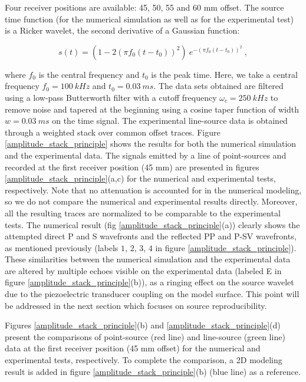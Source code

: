 \documentclass[manuscript,revised]{geophysics}
\begin{document}
Four receiver positions are available: 45, 50, 55 and 60 mm offset. The source time function (for the numerical simulation as well as for the experimental test) is a Ricker wavelet, the second derivative of a Gaussian function:

\begin{equation}
s(t) = (1-2(\pi f_{0}(t-t_{0}))^{2})~e^{-(\pi f_{0}(t-t_{0}))^{2}}~,
\label{eq:ricker-source} 
\end{equation}

\noindent where $f_{0}$ is the central frequency and $t_{0}$ is the peak time. Here, we take a central frequency $f_{0}=100\ kHz$ and $t_{0}=0.03\ ms$. The data sets obtained are filtered using a low-pass Butterworth filter with a cutoff frequency $\omega_{c}=250\ kHz$ to remove noise and tapered at the beginning using a cosine taper function of width $w=0.03\ ms$ on the time signal. The experimental line-source data is obtained through a weighted stack over common offset traces. Figure \ref{amplitude_stack_principle} shows the results for both the numerical simulation and the experimental data. The signals emitted by a line of point-sources and recorded at the first receiver position (45 mm) are presented in figures \ref{amplitude_stack_principle}(a,c) for the numerical and experimental tests, respectively. Note that no attenuation is accounted for in the numerical modeling, so we do not compare the numerical and experimental results directly. Moreover, all the resulting traces are normalized to be comparable to the experimental tests. The numerical result (fig \ref{amplitude_stack_principle}(a)) clearly shows the attempted direct P and S wavefronts and the reflected PP and P-SV wavefronts, as mentioned previously (labels $1$, $2$, $3$, $4$ in figure \ref{amplitude_stack_principle}). These similarities between the numerical simulation and the experimental data are altered by multiple echoes visible on the experimental data (labeled E in figure \ref{amplitude_stack_principle}(b)), as a ringing effect on the source wavelet due to the piezoelectric transducer coupling on the model surface. This point will be addressed in the next section which focuses on source reproducibility. 

\noindent Figures \ref{amplitude_stack_principle}(b) and \ref{amplitude_stack_principle}(d) present the comparisons of point-source (red line) and line-source (green line) data at the first receiver position (45 mm offset) for the numerical and experimental tests, respectively. To complete the comparison, a 2D modeling result is added in figure \ref{amplitude_stack_principle}(b) (blue line) as a reference.
\end{document}
